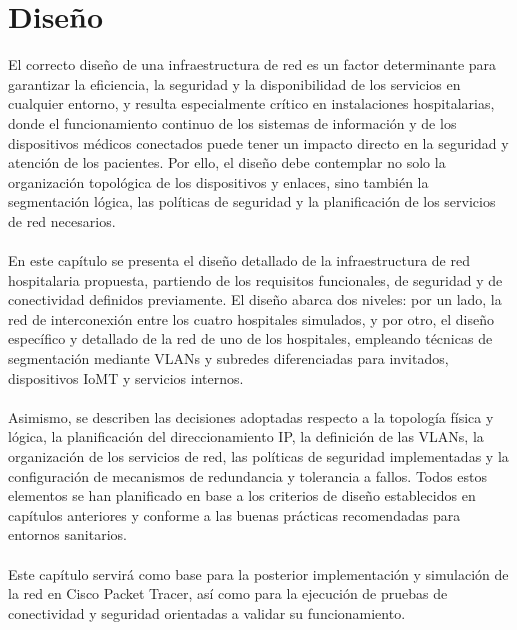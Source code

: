 
\chapter{Diseño}\label{diseño}
El correcto diseño de una infraestructura de red es un factor determinante para garantizar la eficiencia, la seguridad y la disponibilidad de los servicios en cualquier entorno,
 y resulta especialmente crítico en instalaciones hospitalarias, donde el funcionamiento continuo de los sistemas de información y de los dispositivos médicos conectados puede 
 tener un impacto directo en la seguridad y atención de los pacientes. Por ello, el diseño debe contemplar no solo la organización topológica de los dispositivos y enlaces, sino
  también la segmentación lógica, las políticas de seguridad y la planificación de los servicios de red necesarios.
\\ \\
En este capítulo se presenta el diseño detallado de la infraestructura de red hospitalaria propuesta, partiendo de los requisitos funcionales, de seguridad y de conectividad 
definidos previamente. El diseño abarca dos niveles: por un lado, la red de interconexión entre los cuatro hospitales simulados, y por otro, el diseño específico y detallado 
de la red de uno de los hospitales, empleando técnicas de segmentación mediante VLANs y subredes diferenciadas para invitados, dispositivos IoMT y servicios internos.
\\ \\
Asimismo, se describen las decisiones adoptadas respecto a la topología física y lógica, la planificación del direccionamiento IP, la definición de las VLANs, la organización 
de los servicios de red, las políticas de seguridad implementadas y la configuración de mecanismos de redundancia y tolerancia a fallos. Todos estos elementos se han planificado
 en base a los criterios de diseño establecidos en capítulos anteriores y conforme a las buenas prácticas recomendadas para entornos sanitarios.
\\ \\
Este capítulo servirá como base para la posterior implementación y simulación de la red en Cisco Packet Tracer, así como para la ejecución de pruebas de conectividad y 
seguridad orientadas a validar su funcionamiento.

